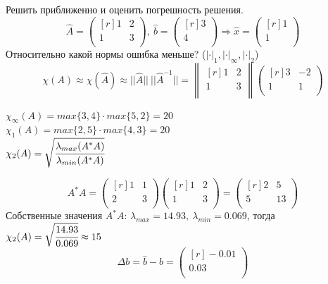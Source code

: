 \documentclass[12pt]{article}
\theoremstyle{definition}
\numberwithin{equation}{section}
\begin{document}
	Решить приближенно и оценить погрешность решения.\\
	\[\hat A=\begin{pmatrix}[r]
	1 & 2 \\
	1 & 3 \\
	\end{pmatrix},~\hat b= \begin{pmatrix}[r]
	3 \\
	4 \\
	\end{pmatrix} \Rightarrow \hat x = \begin{pmatrix}[r]
	1 \\
	1 \\
	\end{pmatrix}\]
	Относительно какой нормы ошибка меньше? ($|\cdot|_1, |\cdot|_{\infty}, |\cdot|_2$)\\
	\[\chi(A)\approx \chi(\hat A)\approx ||\hat A||~||\hat A^{-1}||=\begin{Vmatrix}[r]
	1 & 2 \\
	1 & 3 \\
	\end{Vmatrix} \begin{pmatrix}[r]
	3 & -2 \\
	1 & 1 \\
	\end{pmatrix}\]
	\begin{center}
		$\chi_{\infty}(A)=max\{3, 4\}\cdot max\{5, 2\}=20$\\
		$\chi_1(A)=max\{2, 5\}\cdot max\{4, 3\}=20$\\
		$\chi_2(A)=\sqrt{\cfrac{\lambda_{max}(A^*A)}{\lambda_{min}(A^*A)}}$
	\end{center}
	\[A^*A=\begin{pmatrix}[r]
	1 & 1 \\
	2 & 3 \\
	\end{pmatrix} \begin{pmatrix}[r]
	1 & 2 \\
	1 & 3 \\
	\end{pmatrix} = \begin{pmatrix}[r]
	2 & 5 \\
	5 & 13 \\
	\end{pmatrix}\]
	Собственные значения $A^*A$: $\lambda_{max}=14.93,~ \lambda_{min}=0.069$, тогда $\chi_2(A)=\sqrt{\cfrac{14.93}{0.069}}\approx 15$
	\[\Delta b=\hat b-b =\begin{pmatrix}[r]
	-0.01 \\
	0.03 \\
	\end{pmatrix}\]
\end{document}
